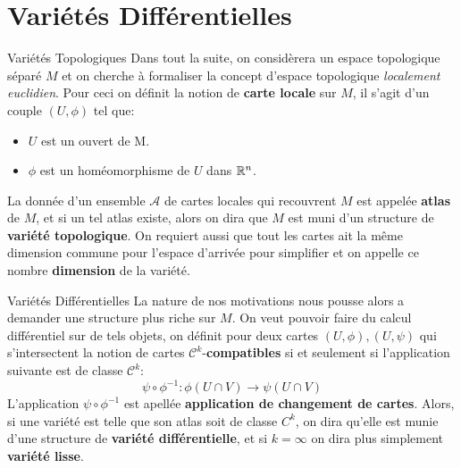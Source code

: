 \documentclass{beamer}
\begin{document}
    \section{Variétés Différentielles}
        \begin{frame}{Variétés Topologiques}
            Dans tout la suite, on considèrera un espace topologique séparé $M$ et on cherche à formaliser la concept d'espace topologique \textit{localement euclidien}. Pour ceci on définit la notion de \textbf{carte locale} sur $M$, il s'agit d'un couple $(U, \phi)$ tel que:
            \begin{itemize}
               \item $U$ est un ouvert de M.
               \item $\phi$ est un homéomorphisme de $U$ dans $\mathbb{R}^n$.
            \end{itemize}
            La donnée d'un ensemble $\mathcal{A}$ de cartes locales qui recouvrent $M$ est appelée \textbf{atlas} de $M$, et si un tel atlas existe, alors on dira que $M$ est muni d'un structure de \textbf{variété topologique}. On requiert aussi que tout les cartes ait la même dimension commune pour l'espace d'arrivée pour simplifier et on appelle ce nombre \textbf{dimension} de la variété.
        \end{frame}
        \begin{frame}{Variétés Différentielles}
            La nature de nos motivations nous pousse alors a demander une structure plus riche sur $M$. On veut pouvoir faire du calcul différentiel sur de tels objets, on définit pour deux cartes \( (U, \phi), (U, \psi) \) qui s'intersectent la notion de cartes \( \mathcal{C}^k \)-\textbf{compatibles} si et seulement si l'application suivante est de classe \( \mathcal{C}^k \):
            \[ 
                \psi \circ \phi^{-1} : \phi(U \cap V) \longrightarrow \psi(U \cap V)
            \]
            L'application \( \psi \circ \phi^{-1} \) est apellée \textbf{application de changement de cartes}. Alors, si une variété est telle que son atlas soit de classe $C^k$, on dira qu'elle est munie d'une structure de \textbf{variété différentielle}, et si $k = \infty$ on dira plus simplement \textbf{variété lisse}.
        \end{frame}
\end{document}
